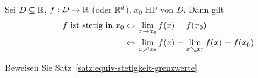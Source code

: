 \begin{satz} %
    \label{satz:equiv-stetigkeit-grenzwerte}
    Sei $D\subseteq \mathbb{R}$, $f: D\rightarrow{} \mathbb{R}$ (oder $\mathbb{R}^d$), $x_0$ HP von $D$. Dann gilt
    \begin{align*}
        f \text{ ist stetig in } x_0 &\Leftrightarrow{} \lim_{x\rightarrow{} x_0} f(x) = f(x_0)\\
        &\Leftrightarrow{} \lim_{x\nearrow x_0} f(x) = \lim_{x\searrow x_0} f(x) = f(x_0)
    \end{align*}
\end{satz}

\begin{uebung}
    Beweisen Sie Satz~\ref{satz:equiv-stetigkeit-grenzwerte}.
\end{uebung}

\newpage